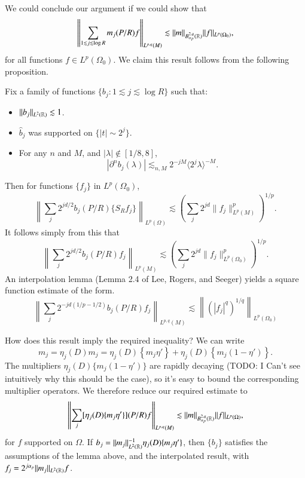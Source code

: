 We could conclude our argument if we could show that
%
\[ \left\| \sum_{1 \lesssim j \lesssim \log R} m_j(P/R) f \right\|_{L^{p,q}(M)} \lesssim \| m \|_{B_{\alpha_p}^{2,q}(\operatorname{\mathbb{R}})} \| f \|_{L^p(\Omega_0)}, \]
%
for all functions $f \in L^p(\Omega_0)$. We claim this result follows from the following proposition.

\begin{lemma}
    Fix a family of functions $\{ b_j: 1 \lesssim j \lesssim \log R \}$ such that:
    \begin{itemize}
        \item $\| b_j \|_{L^2(\operatorname{\mathbb{R}})} \lesssim 1$.

        \item $\widehat{b}_j$ was supported on $\{ |t| \sim 2^j \}$.

        \item For any $n$ and $M$, and $|\lambda| \not \in [1/8, 8]$,
        \[ |\partial^n b_j(\lambda)| \lesssim_{n,M} 2^{-jM} \langle 2^j \lambda \rangle^{-M}. \]
    \end{itemize}
    Then for functions $\{ f_j \}$ in $L^p(\Omega_0)$,
    \[ \left\| \sum_j 2^{jd/2} b_j(P/R) \{ S_R f_j \} \right\|_{L^p(\Omega)} \lesssim \left( \sum_j 2^{jd} \| f_j \|_{L^p(M)}^p \right)^{1/p}. \]
    It follows simply from this that
    \[ \left\| \sum_j 2^{jd/2} b_j(P/R) f_j \right\|_{L^p(M)} \lesssim \left( \sum_j 2^{jd} \| f_j \|_{L^p(\Omega_0)}^p \right)^{1/p}. \]
    An interpolation lemma (Lemma 2.4 of Lee, Rogers, and Seeger) yields a square function estimate of the form.
    \[ \left\| \sum_j 2^{-jd(1/p - 1/2)} b_j(P/R) f_j \right\|_{L^{p,q}(M)} \lesssim \left\| \left( |f_j|^q \right)^{1/q} \right\|_{L^p(\Omega_0)} \]
\end{lemma}

How does this result imply the required inequality? We can write
%
\[ m_j = \eta_j(D) m_j = \eta_j(D) \left\{ m_j \eta' \right\} + \eta_j(D) \left\{ m_j (1 - \eta') \right\}. \]
%
The multipliers $\eta_j(D) \{ m_j (1 - \eta') \}$ are rapidly decaying (TODO: I Can't see intuitively why this should be the case), so it's easy to bound the corresponding multiplier operators. We therefore reduce our required estimate to
%
\[ \left\| \sum_j [ \eta_j(D) \{ m_j \eta' \} ](P/R) f \right\|_{L^{p,q}(M)} \lesssim \| m \|_{B^{2,q}_{\alpha_p}(\operatorname{\mathbb{R}})} \| f \|_{L^p(\Omega)}, \]
%
for $f$ supported on $\Omega$. If $b_j = \| m_j \|_{L^2(\operatorname{\mathbb{R}})}^{-1} \eta_j(D) \{ m_j \eta' \}$, then $\{ b_j \}$ satisfies the assumptions of the lemma above, and the interpolated result, with $f_j = 2^{j \alpha_p} \| m_j \|_{L^2(\operatorname{\mathbb{R}})} f$.

